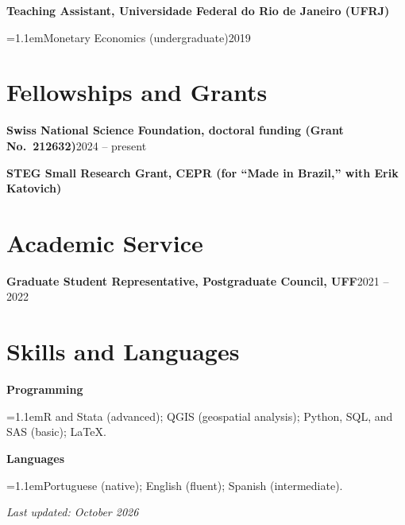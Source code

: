 \documentclass[11pt]{article}
\newcommand{\entry}[2]{\noindent\textbf{#1}\hfill #2\par}
\newcommand{\subline}[1]{{\leftskip=1.1em\noindent #1\par}}
\begin{document}
\entry{Teaching Assistant, Universidade Federal do Rio de Janeiro (UFRJ)}{}
\subline{Monetary Economics (undergraduate)\hfill 2019}

\section*{Fellowships and Grants}

\entry{Swiss National Science Foundation, doctoral funding (Grant No.\ 212632)}{2024 -- present}
\entry{STEG Small Research Grant, CEPR (for ``Made in Brazil,'' with Erik Katovich)}{}

\section*{Academic Service}

\entry{Graduate Student Representative, Postgraduate Council, UFF}{2021 -- 2022}

\section*{Skills and Languages}

\entry{Programming}{}
\subline{R and Stata (advanced); QGIS (geospatial analysis); Python, SQL, and SAS (basic); \LaTeX.}

\entry{Languages}{}
\subline{Portuguese (native); English (fluent); Spanish (intermediate).}

\vfill
\begin{center}
  \footnotesize\itshape Last updated: October 2026
\end{center}
\end{document}
